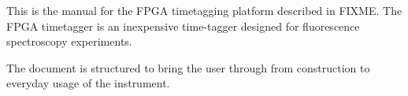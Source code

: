 This is the manual for the FPGA timetagging platform described in
FIXME. The FPGA timetagger is an inexpensive time-tagger designed for
fluorescence spectroscopy experiments.

The document is structured to bring the user through from
construction to everyday usage of the instrument.

